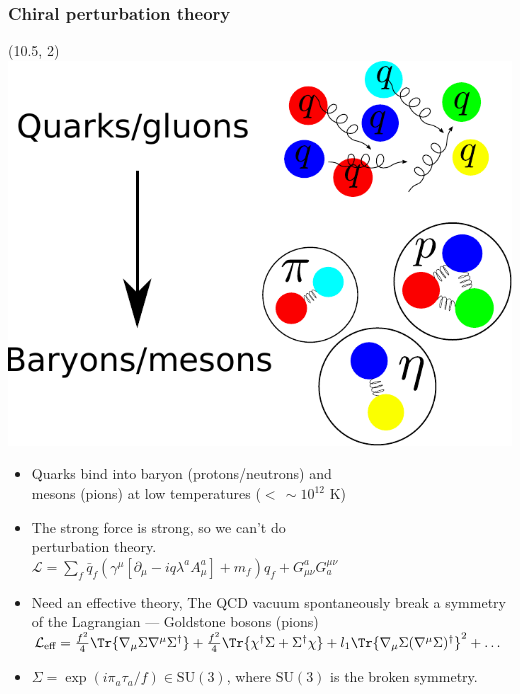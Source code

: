 \documentclass[aspectratio=169]{beamer}
\begin{document}
    \begin{frame}

        \frametitle{Chiral perturbation theory}

        \begin{textblock}{4.8}(10.5, 2)
            \includegraphics[width=\textwidth]{quarks-to-mesons.pdf}
        \end{textblock}

        \begin{itemize}
            \itemsep 0.4cm
            \item Quarks bind into baryon (protons/neutrons) and \\ mesons (pions) at low temperatures ($< \, \sim10^{12}$ K)
            \item The strong force is strong, so we can't do\\ perturbation theory.\\
            $
            \mathcal L = 
            \sum_f \bar q_f (\gamma^\mu [\partial_\mu - i q \lambda^a A^a_\mu ] + m_f)q_f
            + G^a_{\mu \nu} G_a^{\mu \nu}
            $
            \item Need an effective theory, The QCD vacuum spontaneously break a symmetry of the Lagrangian --- Goldstone bosons (pions)\\
            $
            \mathcal L_\text{eff} = 
            \frac{f^2}{4} \Tr{\nabla_\mu \Sigma \nabla^\mu \Sigma^\dagger}
            + \frac{f^2}{4} \Tr{\chi^\dagger \Sigma + \Sigma^\dagger \chi} 
            + l_1 \Tr{\nabla_\mu \Sigma (\nabla^\mu \Sigma)^\dagger}^2+
            \dots
            $ \\
            \item $\Sigma = \exp\left( i \pi_a \tau_a / f \right) \in \text{SU}(3)$, where $\text{SU}(3)$ is the broken symmetry.

        \end{itemize}


    \end{frame}
\end{document}

